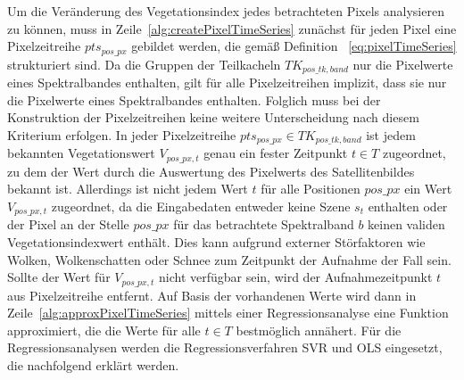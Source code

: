 Um die Veränderung des Vegetationsindex jedes betrachteten Pixels analysieren zu können, muss in Zeile~\ref{alg:createPixelTimeSeries} zunächst für jeden Pixel eine Pixelzeitreihe $pts_{pos\_px}$ gebildet werden, die gemäß Definition ~\ref{eq:pixelTimeSeries} strukturiert sind. Da die Gruppen der Teilkacheln $TK_{pos\_tk, band}$ nur die Pixelwerte eines Spektralbandes enthalten, gilt für alle Pixelzeitreihen implizit, dass sie nur die Pixelwerte eines Spektralbandes enthalten. Folglich muss bei der Konstruktion der Pixelzeitreihen keine weitere Unterscheidung nach diesem Kriterium erfolgen. In jeder Pixelzeitreihe $pts_{pos\_px} \in TK_{pos\_tk, band}$ ist jedem bekannten Vegetationswert $V_{pos\_px, t}$ genau ein fester Zeitpunkt $t \in T$ zugeordnet, zu dem der Wert durch die Auswertung des Pixelwerts des Satellitenbildes bekannt ist. Allerdings ist nicht jedem Wert $t$ für alle Positionen $pos\_px$ ein Wert $V_{pos\_px, t}$ zugeordnet, da die Eingabedaten entweder keine Szene $s_t$  enthalten oder der Pixel an der Stelle $pos\_px$ für das betrachtete Spektralband $b$ keinen validen Vegetationsindexwert enthält. Dies kann aufgrund externer Störfaktoren wie Wolken, Wolkenschatten oder Schnee zum Zeitpunkt der Aufnahme der Fall sein. Sollte der Wert für $V_{pos\_px, t}$ nicht verfügbar sein, wird der Aufnahmezeitpunkt $t$ aus Pixelzeitreihe entfernt. Auf Basis der vorhandenen Werte wird dann in Zeile~\ref{alg:approxPixelTimeSeries} mittels einer Regressionsanalyse eine Funktion approximiert, die die Werte für alle $t \in T$ bestmöglich annähert. Für die Regressionsanalysen werden die Regressionsverfahren SVR und OLS eingesetzt, die nachfolgend erklärt werden. \\

